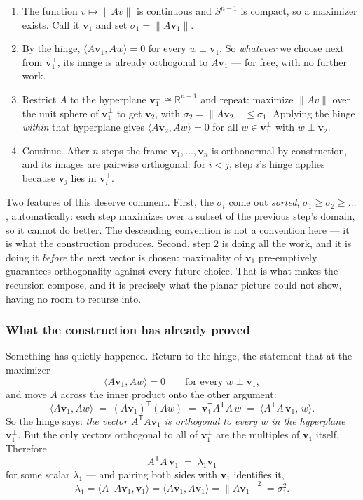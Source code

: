 \documentclass[11pt]{article}
\numberwithin{equation}{section}
\newcommand{\R}{\mathbb{R}}
\newcommand{\T}{^{\mathsf{T}}}
\newcommand{\ip}[2]{\langle #1, #2 \rangle}
\newcommand{\vv}[1]{\mathbf{v}_{#1}}
\theoremstyle{plainish}
\begin{document}
\begin{enumerate}\itemsep0.35em
\item The function $v \mapsto \|Av\|$ is continuous and $S^{n-1}$ is compact, so
a maximizer exists. Call it $\vv1$ and set $\sigma_1 = \|A\vv1\|$.
\item By the hinge, $\ip{A\vv1}{Aw} = 0$ for every $w \perp \vv1$. So
\emph{whatever} we choose next from $\vv1^\perp$, its image is already
orthogonal to $A\vv1$ --- for free, with no further work.
\item Restrict $A$ to the hyperplane $\vv1^\perp \cong \R^{n-1}$ and repeat:
maximize $\|Av\|$ over the unit sphere of $\vv1^\perp$ to get $\vv2$, with
$\sigma_2 = \|A\vv2\| \leq \sigma_1$. Applying the hinge \emph{within} that
hyperplane gives $\ip{A\vv2}{Aw} = 0$ for all $w \in \vv1^\perp$ with
$w \perp \vv2$.
\item Continue. After $n$ steps the frame $\vv1, \dots, \vv n$ is orthonormal by
construction, and its images are pairwise orthogonal: for $i < j$, step $i$'s
hinge applies because $\vv j$ lies in $\vv i^\perp$.
\end{enumerate}

\noindent
Two features of this deserve comment. First, the $\sigma_i$ come out
\emph{sorted}, $\sigma_1 \geq \sigma_2 \geq \dots$, automatically: each step
maximizes over a subset of the previous step's domain, so it cannot do better.
The descending convention is not a convention here --- it is what the
construction produces. Second, step 2 is doing all the work, and it is doing it
\emph{before} the next vector is chosen: maximality of $\vv1$ pre-emptively
guarantees orthogonality against every future choice. That is what makes the
recursion compose, and it is precisely what the planar picture could not show,
having no room to recurse into.

\subsubsection*{What the construction has already proved}
\label{sec:bridge}

Something has quietly happened. Return to the hinge, the statement that at the
maximizer
\begin{equation}\ip{A\vv1}{Aw} = 0 \qquad\text{for every } w \perp \vv1,
\end{equation}
and move $A$ across the inner product onto the other argument:
\begin{equation}\ip{A\vv1}{Aw}
\;=\; (A\vv1)\T (Aw)
\;=\; \vv1\T A\T A\, w
\;=\; \ip{A\T A\, \vv1}{\,w} .
\end{equation}
So the hinge says: \emph{the vector $A\T A \vv1$ is orthogonal to every $w$ in
the hyperplane $\vv1^\perp$.} But the only vectors orthogonal to all of
$\vv1^\perp$ are the multiples of $\vv1$ itself. Therefore
\begin{equation}\boxed{\;A\T A\, \vv1 \;=\; \lambda_1 \vv1\;}
\end{equation}
for some scalar $\lambda_1$ --- and pairing both sides with $\vv1$ identifies it,
\begin{equation}\lambda_1 = \ip{A\T A \vv1}{\vv1} = \ip{A\vv1}{A\vv1} = \|A\vv1\|^2 = \sigma_1^2 .
\end{equation}
\end{document}
